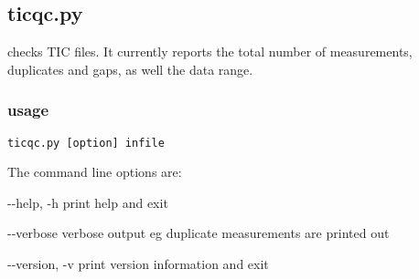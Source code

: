 \subsection{ticqc.py}

\hypertarget{h:ticqc}{}

 checks TIC files. It currently reports the total number of measurements, duplicates and gaps,
as well the data range.

\subsubsection{usage}

\begin{lstlisting}[mathescape=true]
ticqc.py [option] infile
\end{lstlisting}
The command line options are:
\begin{description*}
\item[-{}-help, -h] print help and exit
\item[-{}-verbose ] verbose output eg duplicate measurements are printed out
\item[-{}-version, -v] print version information and exit
\end{description*}


